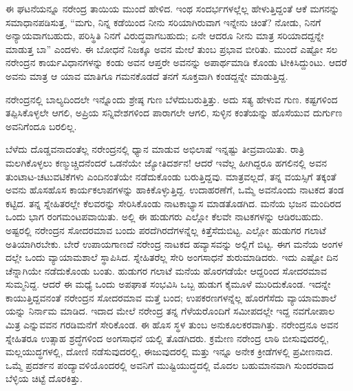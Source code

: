 ಈ ಘಟನೆಯನ್ನೂ ನರೇಂದ್ರ ತಾಯಿಯ ಮುಂದೆ ಹೇಳಿದ. ಇಂಥ ಸಂದರ್ಭಗಳಲ್ಲೆಲ್ಲ ಹೇಳುತ್ತಿದ್ದಂತೆ ಆಕೆ ಮಗನನ್ನು ಸಮಾಧಾನಪಡಿಸುತ್ತ, “ಮಗು, ನಿನ್ನ ಕಡೆಯಿಂದ ನೀನು ಸರಿಯಾಗಿರುವಾಗ ಇನ್ನೇನು ಚಿಂತೆ? ನೋಡು, ನಿನಗೆ ಅನ್ಯಾಯವಾಗಬಹುದು, ಪರಿಸ್ಥಿತಿ ನಿನಗೆ ವಿರುದ್ಧವಾಗಬಹುದು; ಏನೇ ಆದರೂ ನೀನು ಮಾತ್ರ ಸರಿಯಾದದ್ದನ್ನೇ ಮಾಡುತ್ತ ಬಾ” ಎಂದಳು. ಈ ಬೋಧನೆ ನಿಜಕ್ಕೂ ಅವನ ಮೇಲೆ ತುಂಬ ಪ್ರಭಾವ ಬೀರಿತು. ಮುಂದೆ ಎಷ್ಟೋ ಸಲ ನರೇಂದ್ರನ ಕಾರ್ಯವಿಧಾನಗಳನ್ನು ಕಂಡು ಅವನ ಆಪ್ತರೇ ಅವನನ್ನು ಅಪಾರ್ಥಮಾಡಿ ಕೊಂಡು ಟೀಕಿಸಿದ್ದುಂಟು. ಆದರೆ ಅವನು ಮಾತ್ರ ಆ ಯಾವ ಮಾತಿಗೂ ಗಮನಕೊಡದೆ ತನಗೆ ಸೂಕ್ತವಾಗಿ ಕಂಡದ್ದನ್ನೇ ಮಾಡುತ್ತಿದ್ದ.

ನರೇಂದ್ರನಲ್ಲಿ ಬಾಲ್ಯದಿಂದಲೇ ಇನ್ನೊಂದು ಶ್ರೇಷ್ಠ ಗುಣ ಬೆಳೆದುಬರುತ್ತಿತ್ತು. ಅದು ಸತ್ಯ ಹೇಳುವ ಗುಣ. ಕಷ್ಟಗಳಿಂದ ತಪ್ಪಿಸಿಕೊಳ್ಳಲೇ ಆಗಲಿ, ಅಪ್ರಿಯ ಸನ್ನಿವೇಶಗಳಿಂದ ಪಾರಾಗಲೇ ಆಗಲಿ, ಸುಳ್ಳಿನ ಕಂತೆಯನ್ನು ಹೊಸೆಯುವ ದುರ್ಗುಣ ಅವನಿಗೆಂದೂ ಬರಲಿಲ್ಲ.

ಬೆಳೆದು ದೊಡ್ಡವನಾದಂತೆಲ್ಲ ನರೇಂದ್ರನಲ್ಲಿ ಧ್ಯಾನ ಮಾಡುವ ಅಭಿಲಾಷೆ ಇನ್ನಷ್ಟು ತೀವ್ರವಾಯಿತು. ರಾತ್ರಿ ಮಲಗಿಕೊಳ್ಳಲು ಕಣ್ಮುಚ್ಚಿದನೆಂದರೆ ಒಡನೆಯೇ ಜ್ಯೋತಿದರ್ಶನ! ಆದರೆ ಇವೆಲ್ಲ ಹೀಗಿದ್ದರೂ ಹಗಲಿನಲ್ಲಿ ಅವನ ತುಂಟಾಟ-ಚಟುವಟಿಕೆಗಳು ಎಂದಿನಂತೆಯೇ ನಡೆದುಕೊಂಡು ಬರುತ್ತಿದ್ದವು. ಮಾತ್ರವಲ್ಲದೆ, ತನ್ನ ವಯಸ್ಸಿಗೆ ತಕ್ಕಂತೆ ಅವನು ಹೊಸಹೊಸ ಕಾರ್ಯಕಲಾಪಗಳನ್ನು ಹಾಕಿಕೊಳ್ಳುತ್ತಿದ್ದ. ಉದಾಹರಣೆಗೆ, ಒಮ್ಮೆ ಅವನೊಂದು ನಾಟಕದ ತಂಡ ಕಟ್ಟಿದ. ತನ್ನ ಸ್ನೇಹಿತರಲ್ಲೇ ಕೆಲವರನ್ನು ಸೇರಿಸಿಕೊಂಡು ನಾಟಕಾಭ್ಯಾಸ ಮಾಡತೊಡಗಿದ. ಮನೆಯ ಭಜನ ಮಂದಿರದ ಒಂದು ಭಾಗ ರಂಗಮಂಟಪವಾಯಿತು. ಅಲ್ಲಿ ಈ ಹುಡುಗರು ಎಲ್ಲೋ ಕೆಲವೇ ನಾಟಕಗಳನ್ನು ಆಡಿರಬಹುದು. ಅಷ್ಟರಲ್ಲಿ ನರೇಂದ್ರನ ಸೋದರಮಾವ ಬಂದು ಪರದೆಗಿರದೆಗಳನ್ನೆಲ್ಲ ಕಿತ್ತೆಸೆದುಬಿಟ್ಟ. ಎಲ್ಲೋ ಹುಡುಗರ ಗಲಾಟೆ ಅತಿಯಾಗಿರಬೇಕು. ಬೇರೆ ಉಪಾಯಗಾಣದೆ ನರೇಂದ್ರ ನಾಟಕದ ಹವ್ಯಾಸವನ್ನು ಅಲ್ಲಿಗೆ ಬಿಟ್ಟ. ಈಗ ಮನೆಯ ಅಂಗಳ ದಲ್ಲೇ ಒಂದು ವ್ಯಾಯಾಮಶಾಲೆ ಸ್ಥಾಪಿಸಿದ. ಸ್ನೇಹಿತರೆಲ್ಲ ಸೇರಿ ಅಂಗಸಾಧನೆ ಶುರುಮಾಡಿದರು. ಇದು ಎಷ್ಟೋ ದಿನ ಚೆನ್ನಾಗಿಯೇ ನಡೆದುಕೊಂಡು ಬಂತು. ಹುಡುಗರ ಗಲಾಟೆ ಮನೆಯ ಹೊರಗಡೆಯೇ ಆದ್ದರಿಂದ ಸೋದರಮಾವ ಸುಮ್ಮನಿದ್ದ. ಆದರೆ ಈ ಮಧ್ಯೆ ಒಂದು ಅಪಘಾತ ಸಂಭವಿಸಿ ಒಬ್ಬ ಹುಡುಗ ಕೈಮೂಳೆ ಮುರಿದುಕೊಂಡ. ಇದನ್ನೇ ಕಾಯುತ್ತಿದ್ದವನಂತೆ ನರೇಂದ್ರನ ಸೋದರಮಾವ ಮತ್ತೆ ಬಂದ; ಉಪಕರಣಗಳನ್ನೆಲ್ಲ ಹೊರಗೆಸೆದು ವ್ಯಾಯಾಮಶಾಲೆ ಯನ್ನು ನಿರ್ನಾಮ ಮಾಡಿದ. ಇದಾದ ಮೇಲೆ ನರೇಂದ್ರ ತನ್ನ ಗೆಳೆಯರೊಂದಿಗೆ ಸಮೀಪದಲ್ಲೇ ಇದ್ದ ನವಗೋಪಾಲ ಮಿತ್ರ ಎನ್ನುವವನ ಗರಡಿಮನೆಗೆ ಸೇರಿಕೊಂಡ. ಈ ಹೊಸ ಸ್ಥಳ ತುಂಬ ಅನುಕೂಲಕರವಾಗಿತ್ತು. ನರೇಂದ್ರನೂ ಅವನ ಸ್ನೇಹಿತರೂ ಉತ್ಸಾಹ ಶ್ರದ್ಧೆಗಳಿಂದ ಅಂಗಸಾಧನೆ ಯಲ್ಲಿ ತೊಡಗಿದರು. ಕ್ರಮೇಣ ನರೇಂದ್ರ ಲಾಠಿ ಬೀಸುವುದರಲ್ಲಿ, ಮಲ್ಲಯುದ್ಧಗಳಲ್ಲಿ, ದೋಣಿ ನಡೆಸುವುದರಲ್ಲಿ, ಈಜುವುದರಲ್ಲಿ ಮತ್ತು ಇನ್ನೂ ಅನೇಕ ಕ್ರೀಡೆಗಳಲ್ಲಿ ಪ್ರವೀಣನಾದ. ಒಮ್ಮೆ ಪ್ರದರ್ಶನ ಪಂದ್ಯಾವಳಿಯೊಂದರಲ್ಲಿ ಅವನಿಗೆ ಮುಷ್ಟಿಯುದ್ಧದಲ್ಲಿ ಮೊದಲ ಬಹುಮಾನವಾಗಿ ಸುಂದರವಾದ ಬೆಳ್ಳಿಯ ಚಿಟ್ಟೆ ದೊರಕಿತ್ತು.

